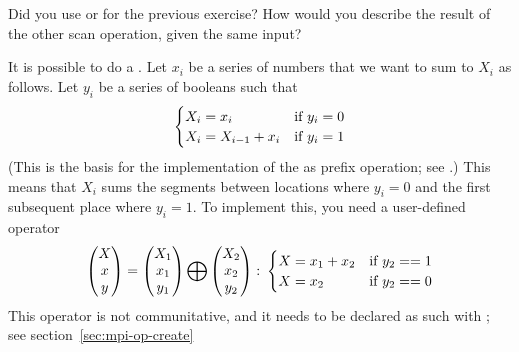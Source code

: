 \begin{exercise}
  Did you use  or  for
  the previous exercise?
  How would you describe the result of the other scan operation, given the
  same input?
\end{exercise}


It is possible to do a . Let $x_i$ be a series of numbers
that we want to sum to $X_i$ as follows. Let $y_i$ be a series of booleans such that
\[ 
\begin{cases}
  X_i=x_i&\hbox{if $y_i=0$}\\
  X_i=X_{i-1}+x_i&\hbox{if $y_i=1$}
\end{cases}
\]
(This is the basis for the implementation of the 
as prefix operation; see .)
This means that $X_i$ sums the segments between locations where $y_i=0$ and the
first subsequent place where $y_i=1$. To implement this, you need a user-defined operator
\[ 
\begin{pmatrix}  X\\ x\\ y\end{pmatrix}
=
\begin{pmatrix}  X_1\\ x_1\\ y_1\end{pmatrix}
\bigoplus
\begin{pmatrix}  X_2\\ x_2\\ y_2\end{pmatrix}\colon
  \begin{cases}
    X=x_1+x_2&\hbox{if $y_2==1$}\\ X=x_2&\hbox{if $y_2==0$}
  \end{cases}
\]
This operator is not communitative, and it needs to be declared as such
with ; see section~\ref{sec:mpi-op-create}


